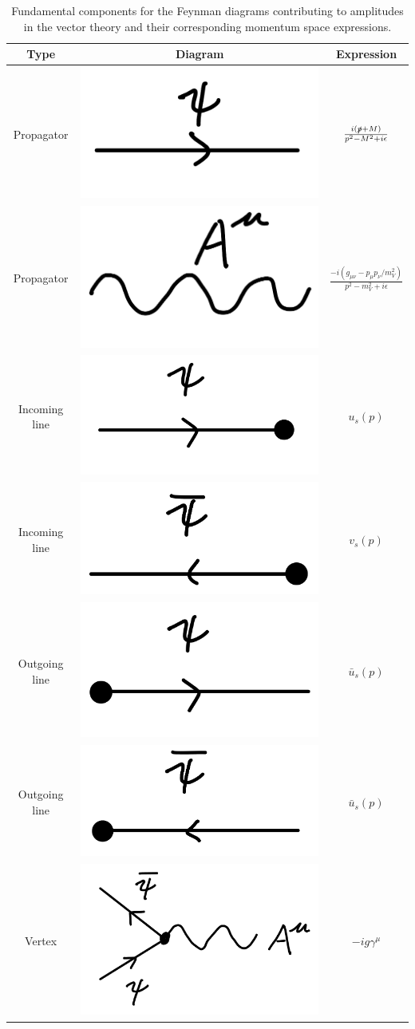 {\begin{table}[h!tb]
\centering
\begin{tabular}{|c|c|c|}
    \hline
    Type & Diagram & Expression \\
    \hline
    Propagator & \includegraphics[width=0.2\linewidth]{D_prop.jpeg} & $\frac{i( \slashed{p} + M )}{p^2 - M^2 + i \epsilon}$ \\
    \hline
    Propagator & \includegraphics[width=0.2\linewidth]{P_prop.jpeg} & $\frac{-i ( g_{\mu\nu} - p_{\mu} p_{\nu} / m_{V}^2 )}{p^2 - m_{V}^2 + i \epsilon}$ \\
    \hline
    Incoming line & \includegraphics[width=0.2\linewidth]{D-part-inc.jpeg} & $u_{s}(p)$ \\
    \hline
    Incoming line & \includegraphics[width=0.2\linewidth]{D-apart-inc.jpeg} & $v_{s}(p)$ \\
    \hline
    Outgoing line & \includegraphics[width=0.2\linewidth]{D-part-out.jpeg} & $\bar{u}_{s}(p)$ \\
    \hline
    Outgoing line & \includegraphics[width=0.2\linewidth]{D-apart-out.jpeg} & $\bar{u}_{s}(p)$ \\
    \hline
    Vertex & \includegraphics[width=0.2\linewidth]{V_int.jpeg} & $-i g \gamma^{\mu}$ \\
    \hline
\end{tabular}
\caption{Fundamental components for the Feynman diagrams contributing to amplitudes in the vector theory and their corresponding momentum space expressions.}
\label{tab:Feynman-rules-V}
\end{table}


}
